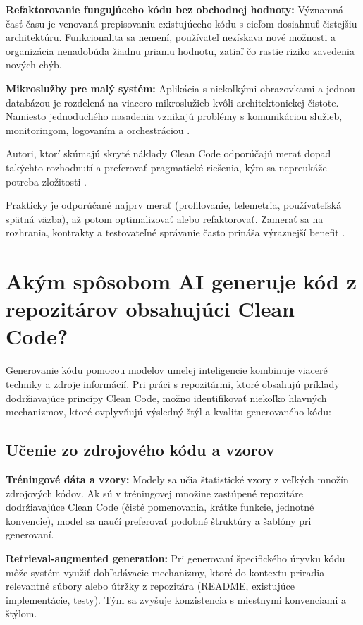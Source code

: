 \textbf{Refaktorovanie fungujúceho kódu bez obchodnej hodnoty:} Významná časť času je venovaná prepisovaniu existujúceho kódu s cieľom dosiahnuť čistejšiu architektúru. Funkcionalita sa nemení, používateľ nezískava nové možnosti a organizácia nenadobúda žiadnu priamu hodnotu, zatiaľ čo rastie riziko zavedenia nových chýb.

\textbf{Mikroslužby pre malý systém:} Aplikácia s niekoľkými obrazovkami a jednou databázou je rozdelená na viacero mikroslužieb kvôli architektonickej čistote. Namiesto jednoduchého nasadenia vznikajú problémy s komunikáciou služieb, monitoringom, logovaním a orchestráciou \cite{HIDDENCOST_KESWANI2025,REDDIT_CLEANCODE2025}.


Autori, ktorí skúmajú skryté náklady Clean Code odporúčajú merať dopad takýchto rozhodnutí a preferovať pragmatické riešenia, kým sa nepreukáže potreba zložitosti \cite{HIDDENCOST_KESWANI2025}.

Prakticky je odporúčané najprv merať (profilovanie, telemetria, používateľská spätná väzba), až potom optimalizovať alebo refaktorovať. Zamerať sa na rozhrania, kontrakty a testovateľné správanie často prináša výraznejší benefit \cite{CLEANCODE_SAM2011, HIDDENCOST_KESWANI2025}.

\newpage
\section{Akým spôsobom AI generuje kód z repozitárov obsahujúci Clean Code?}

Generovanie kódu pomocou modelov umelej inteligencie kombinuje viaceré techniky a zdroje informácií. Pri práci s repozitármi, ktoré obsahujú príklady dodržiavajúce princípy Clean Code, možno identifikovať niekoľko hlavných mechanizmov, ktoré ovplyvňujú výsledný štýl a kvalitu generovaného kódu:

\subsection{Učenie zo zdrojového kódu a vzorov}

\textbf{Tréningové dáta a vzory:} Modely sa učia štatistické vzory z veľkých množín zdrojových kódov. Ak sú v tréningovej množine zastúpené repozitáre dodržiavajúce Clean Code (čisté pomenovania, krátke funkcie, jednotné konvencie), model sa naučí preferovať podobné štruktúry a šablóny pri generovaní.
    
\textbf{Retrieval-augmented generation:} Pri generovaní špecifického úryvku kódu môže systém využiť dohľadávacie mechanizmy, ktoré do kontextu priradia relevantné súbory alebo útržky z repozitára (README, existujúce implementácie, testy). Tým sa zvyšuje konzistencia s miestnymi konvenciami a štýlom.
    
